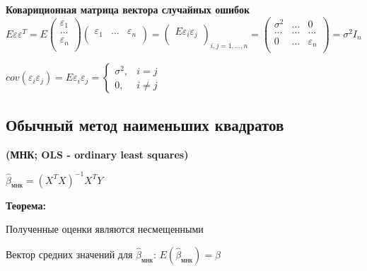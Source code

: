 \documentclass{article}
\begin{document}
\begin{tcolorbox}

\textbf{Ковариционная матрица вектора случайных ошибок} \\ 
$E\varepsilon \varepsilon ^T = E \begin{pmatrix}
\varepsilon_1 \\
... \\
\varepsilon_n \\
\end{pmatrix} 
\begin{pmatrix}
\varepsilon_1 & ... & \varepsilon_n \\
\end{pmatrix} = 
\begin{pmatrix}
E \varepsilon_i \varepsilon_j \\
\end{pmatrix}_{i,j = 1, ... , n} = \begin{pmatrix}
\sigma^2 & ... & 0 \\
... & ... & ... \\
0 & ... & \varepsilon_n \\
\end{pmatrix} = \sigma^2I_n$ \par

\vspace{1mm}
$cov(\varepsilon_i \varepsilon_j) = E \varepsilon_i \varepsilon_j = \left\{ \begin{array}{lcl}
\sigma^2, & i = j \\ 
0, & i \neq j 
\end{array}\right.$


\end{tcolorbox}


\subsection{Обычный метод наименьших квадратов }
\textbf{(МНК; OLS - ordinary least squares)}

\vspace{2mm}
$\hat{\beta}_{\text{мнк}} = (X^TX)^{-1}X^TY$\par

\vspace{2mm}

\textbf{Теорема:}\par
Полученные оценки являются несмещенными \par
Вектор средних значений для $\hat{\beta}_{\text{мнк}}$: $E(\hat{\beta}_{\text{мнк}}) = \beta$\par
\end{document}
